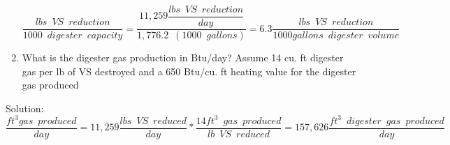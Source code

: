 \begin{enumerate}
                    $
                        \dfrac
                        {
                        lbs \enspace VS \enspace reduction
                        }
                        {
                        1000 \enspace digester \enspace capacity
                        }
                        =
                        \dfrac
                        {
                        11,259 \dfrac
                                {
                                lbs \enspace VS \enspace reduction
                                }
                                {
                                day
                                }
                        }
                        {   
                        1,776.2 \enspace (1000 \enspace gallons)
                        }
                        =\boxed{6.3
                        \dfrac
                        {
                        lbs \enspace VS \enspace reduction
                        }
                        {
                        1000 gallons \enspace digester \enspace volume 
                        }}
                    $
                    \\

                    \vspace{1cm}

                    \item  What is the digester gas production in Btu/day? Assume 14 cu. ft digester gas per lb of VS destroyed and a 650 Btu/cu. ft heating value for the digester gas produced
                    \end{enumerate}
                    \vspace{1cm}
                    Solution:\\

                    $
                        \dfrac 
                        {
                        ft^3 gas \enspace produced
                        }
                        {
                        day
                        }
                        =
                        11,259 \dfrac
                                {
                                lbs \enspace VS \enspace reduced
                                }
                                {
                                day
                                }
                                *
                            \dfrac
                            {
                            14 ft^3 \enspace gas \enspace produced
                            }
                            {
                            lb \enspace VS \enspace reduced
                            }
                            =157,626 \dfrac
                                    {
                                    ft^3 \enspace digester \enspace                     gas \enspace produced
                                    }
                                    {
                                    day
                                    }
                    $
                    \\
                    \vspace{1cm}


